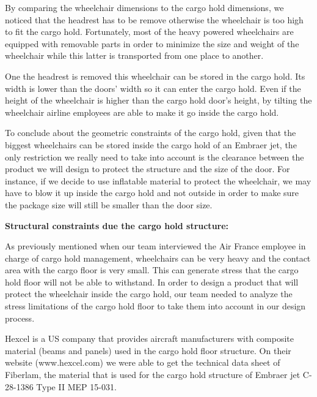 By comparing the wheelchair dimensions to the cargo hold dimensions, we noticed that the headrest has to be remove otherwise the wheelchair is too high to fit the cargo hold. Fortunately, most of the heavy powered wheelchairs are equipped with removable parts in order to minimize the size and weight of the wheelchair while this latter is transported from one place to another.

One the headrest is removed this wheelchair can be stored in the cargo hold. Its width is lower than the doors’ width so it can enter the cargo hold. Even if the height of the wheelchair is higher than the cargo hold door’s height, by tilting the wheelchair airline employees are able to make it go inside the cargo hold.

To conclude about the geometric constraints of the cargo hold, given that the biggest wheelchairs can be stored inside the cargo hold of an Embraer jet, the only restriction we really need to take into account is the clearance between the product we will design to protect the structure and the size of the door. For instance, if we decide to use inflatable material to protect the wheelchair, we may have to blow it up inside the cargo hold and not outside in order to make sure the package size will still be smaller than the door size.

\textbf{Structural constraints due the cargo hold structure:}

As previously mentioned when our team interviewed the Air France employee in charge of cargo hold management, wheelchairs can be very heavy and the contact area with the cargo floor is very small. This can generate stress that the cargo hold floor will not be able to withstand. In order to design a product that will protect the wheelchair inside the cargo hold, our team needed to analyze the stress limitations of the cargo hold floor to take them into account in our design process.

Hexcel is a US company that provides aircraft manufacturers with composite material (beams and panels) used in the cargo hold floor structure. On their website (www.hexcel.com) we were able to get the technical data sheet of Fiberlam, the material that is used for the cargo hold structure of Embraer jet C-28-1386 Type II MEP 15-031.

